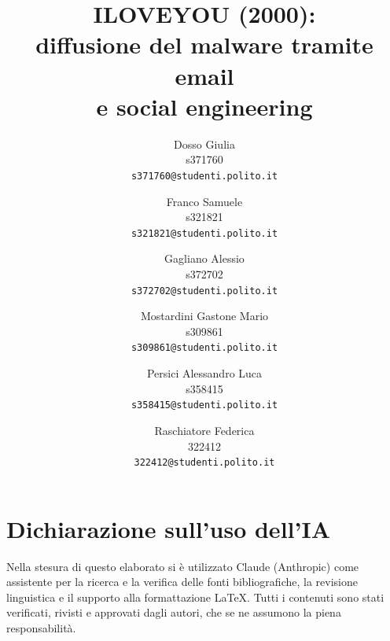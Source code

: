 \documentclass[10pt,twocolumn,letterpaper]{article}
\title{ILOVEYOU (2000):\\
diffusione del malware tramite email\\
e social engineering}
\author{
Dosso Giulia\\
s371760\\
{\tt\small s371760@studenti.polito.it}
\and
Franco Samuele\\
s321821\\
{\tt\small s321821@studenti.polito.it}
\and
Gagliano Alessio\\
s372702\\
{\tt\small s372702@studenti.polito.it}
\and
Mostardini Gastone Mario\\
s309861\\
{\tt\small s309861@studenti.polito.it}
\and
Persici Alessandro Luca\\
s358415\\
{\tt\small s358415@studenti.polito.it}
\and
Raschiatore Federica\\
322412\\
{\tt\small 322412@studenti.polito.it}
}
\begin{document}
\maketitle







\section*{Dichiarazione sull'uso dell'IA}
Nella stesura di questo elaborato si è utilizzato Claude (Anthropic) come assistente
per la ricerca e la verifica delle fonti bibliografiche, la revisione linguistica e il
supporto alla formattazione \LaTeX{}. Tutti i contenuti sono stati verificati,
rivisti e approvati dagli autori, che se ne assumono la piena responsabilità.
{
    \small
    \nocite{gao2000iloveyou,cialdini1984influence}
    
    
}

% 
\end{document}
